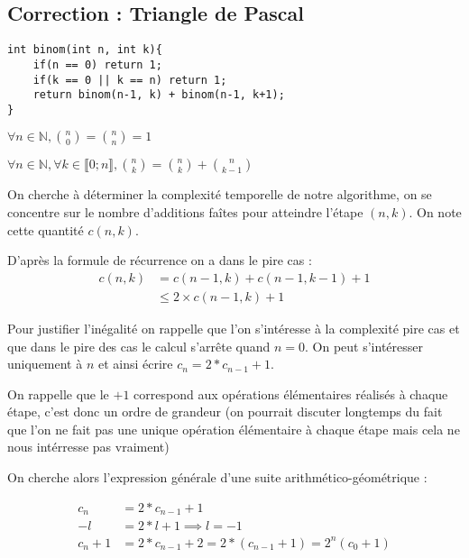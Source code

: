 \documentclass[border=10pt,preview]{standalone}
\begin{document}
\subsection*{Correction : Triangle de Pascal}
\begin{enumerate}
    \item {
\begin{verbatim}
int binom(int n, int k){
    if(n == 0) return 1;
    if(k == 0 || k == n) return 1;
    return binom(n-1, k) + binom(n-1, k+1);
}
\end{verbatim}
    }
    \item $\forall n \in \mathbb{N}, \binom{n}{0} = \binom{n}{n} = 1$
    \item $\forall n \in \mathbb{N}, \forall k \in \llbracket 0; n \rrbracket, \binom{n}{k} = \binom{n}{k} + \binom{n}{k-1}$
    \item {
    \item {
    On cherche à déterminer la complexité temporelle de notre algorithme, on se concentre sur le nombre d'additions faîtes pour atteindre l'étape $(n, k)$. On note cette quantité $c(n, k)$.

    D'après la formule de récurrence on a dans le pire cas :
    \begin{equation*} \label{}
    \begin{split}
        c(n, k) & = c(n-1, k) + c(n-1, k-1) + 1 \\
                & \leq 2 \times c(n-1, k) + 1
    \end{split}
    \end{equation*}

    Pour justifier l'inégalité on rappelle que l'on s'intéresse à la complexité pire cas et que dans le pire des cas le calcul s'arrête quand $n = 0$. On peut s'intéresser uniquement à $n$ et ainsi écrire $c_n = 2 * c_{n-1} + 1$.

    On rappelle que le $+1$ correspond aux opérations élémentaires réalisés à chaque étape, c'est donc un ordre de grandeur (on pourrait discuter longtemps du fait que l'on ne fait pas une unique opération élémentaire à chaque étape mais cela ne nous intérresse pas vraiment)

    On cherche alors l'expression générale d'une suite arithmético-géométrique : 
    
    \begin{equation*} \label{}
    \begin{split}
      c_n & = 2 * c_{n-1} + 1 \\
      - l & = 2*l + 1 \implies l = -1 \\
      c_n + 1 &= 2*c_{n-1} + 2 = 2*(c_{n-1} + 1) = 2^n (c_0 + 1)
    \end{split}
    \end{equation*}

}}
\end{enumerate}
\end{document}
